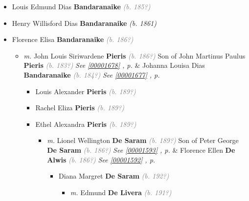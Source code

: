 \documentclass[10pt, openany]{book}
\begin{document}
\begin{itemize}
{\begin{itemize}
{\begin{itemize}
{\begin{itemize}
{  }
\end{itemize}}
\end{itemize}
   }
\item{Louis Edmund Dias \textbf{Bandaranaike} \textcolor{gray}{\textit{(b. 185?)}}
   }
\item{Henry Willisford Dias \textbf{Bandaranaike} \textcolor{slorange}{\textit{(b. 1861)}}
   }
\item{Florence Elisa \textbf{Bandaranaike} \textcolor{gray}{\textit{(b. 186?)}}
\begin{itemize}
\item{\textit{m.} John Louis Siriwardene \textbf{Pieris} \textcolor{gray}{\textit{(b. 186?)}} Son of  John Martinus Paulus \textbf{Pieris} \textcolor{gray}{\textit{(b. 183?)}} \textcolor{slteal}{\textit{See  \autoref{00001678} \textit{, p. \pageref{00001678} }}}  \&  Johanna Louisa Dias \textbf{Bandaranaike} \textcolor{gray}{\textit{(b. 184?)}} \textcolor{slteal}{\textit{See  \autoref{00001677} \textit{, p. \pageref{00001677} }}}   \label{couple:00001687:00001688} \begin{itemize}
\item{Louis Alexander \textbf{Pieris} \textcolor{gray}{\textit{(b. 189?)}}
  }
\item{Rachel Eliza \textbf{Pieris} \textcolor{gray}{\textit{(b. 189?)}}
  }
\item{Ethel Alexandra \textbf{Pieris} \textcolor{gray}{\textit{(b. 189?)}}
\begin{itemize}
\item{\textit{m.} Lionel Wellington  \textbf{De Saram} \textcolor{gray}{\textit{(b. 189?)}} Son of  Peter George \textbf{De Saram} \textcolor{gray}{\textit{(b. 186?)}} \textcolor{slteal}{\textit{See  \autoref{00001593} \textit{, p. \pageref{00001593} }}}  \&  Florence Ellen \textbf{De Alwis} \textcolor{gray}{\textit{(b. 186?)}} \textcolor{slteal}{\textit{See  \autoref{00001592} \textit{, p. \pageref{00001592} }}}   \label{couple:00001596:00001597} \begin{itemize}
\item{Diana Margret \textbf{De Saram} \textcolor{gray}{\textit{(b. 192?)}}
\begin{itemize}
\item{\textit{m.} Edmund \textbf{De Livera} \textcolor{gray}{\textit{(b. 191?)}}   \label{couple:00001695:00001696} \begin{itemize}

\end{itemize}}
\end{itemize}}
\end{itemize}}
\end{itemize}}
\end{itemize}}
\end{itemize}}
\end{itemize}}
\end{itemize}
\end{document}
